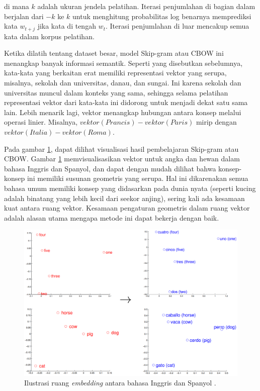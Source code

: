     di mana \(k\) adalah ukuran jendela pelatihan. Iterasi penjumlahan di bagian dalam berjalan dari \({-k}\) ke \(k\) untuk menghitung probabilitas log benarnya memprediksi kata \(w_{t+j}\) jika kata di tengah \(w_{t}\). Iterasi penjumlahan di luar mencakup semua kata dalam korpus pelatihan. 

    Ketika dilatih tentang dataset besar, model Skip-gram atau CBOW ini menangkap banyak informasi semantik. Seperti yang disebutkan sebelumnya, kata-kata yang berkaitan erat memiliki representasi vektor yang serupa, misalnya, sekolah dan universitas, danau, dan sungai. Ini karena sekolah dan universitas muncul dalam konteks yang sama, sehingga selama pelatihan representasi vektor dari kata-kata ini didorong untuk menjadi dekat satu sama lain. Lebih menarik lagi, vektor menangkap hubungan antara konsep melalui operasi linier. Misalnya, \(vektor(Prancis) - vektor(Paris)\) mirip dengan \(vektor(Italia) - vektor(Roma)\).

    Pada gambar \ref{fig:ilustrasi_embedding_inggris_spanyol}, dapat dilihat visualisasi hasil pembelajaran Skip-gram atau CBOW. Gambar \ref{fig:ilustrasi_embedding_inggris_spanyol} memvisualisasikan vektor untuk angka dan hewan dalam bahasa Inggris dan Spanyol, dan dapat dengan mudah dilihat bahwa konsep-konsep ini memiliki susunan geometris yang serupa. Hal ini dikarenakan semua bahasa umum memiliki konsep yang didasarkan pada dunia nyata (seperti kucing adalah binatang yang lebih kecil dari seekor anjing), sering kali ada kesamaan kuat antara ruang vektor. Kesamaan pengaturan geometris dalam ruang vektor adalah alasan utama mengapa metode ini dapat bekerja dengan baik.

    \begin{figure}[ht]
        \centering
        \includegraphics[width=1\textwidth]{resources/ilustration-eng-spn-word.png}
        \caption{Ilustrasi ruang \textit{embedding} antara bahasa Inggris dan Spanyol \parencite{MikolovExploiting}.}
        \label{fig:ilustrasi_embedding_inggris_spanyol}
    \end{figure}

